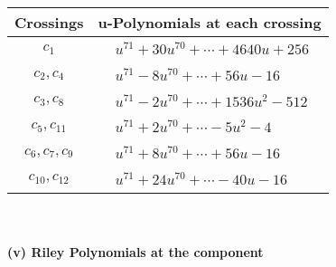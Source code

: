 \documentclass[1p]{elsarticle_modified}
\theoremstyle{definition}
\begin{document}
\begin{tabular}{m{50pt}|m{274pt}}
Crossings & \hspace{64pt}u-Polynomials at each crossing \\
\hline $$\begin{aligned}c_{1}\end{aligned}$$&$\begin{aligned}
&u^{71}+30 u^{70}+\cdots+4640 u+256
\end{aligned}$\\
\hline $$\begin{aligned}c_{2},c_{4}\end{aligned}$$&$\begin{aligned}
&u^{71}-8 u^{70}+\cdots+56 u-16
\end{aligned}$\\
\hline $$\begin{aligned}c_{3},c_{8}\end{aligned}$$&$\begin{aligned}
&u^{71}-2 u^{70}+\cdots+1536 u^2-512
\end{aligned}$\\
\hline $$\begin{aligned}c_{5},c_{11}\end{aligned}$$&$\begin{aligned}
&u^{71}+2 u^{70}+\cdots-5 u^2-4
\end{aligned}$\\
\hline $$\begin{aligned}c_{6},c_{7},c_{9}\end{aligned}$$&$\begin{aligned}
&u^{71}+8 u^{70}+\cdots+56 u-16
\end{aligned}$\\
\hline $$\begin{aligned}c_{10},c_{12}\end{aligned}$$&$\begin{aligned}
&u^{71}+24 u^{70}+\cdots-40 u-16
\end{aligned}$\\
\hline
\end{tabular}\\~\\
\newpage\renewcommand{\arraystretch}{1}
\flushleft \textbf{(v) Riley Polynomials at the component}\newline \\
\end{document}
